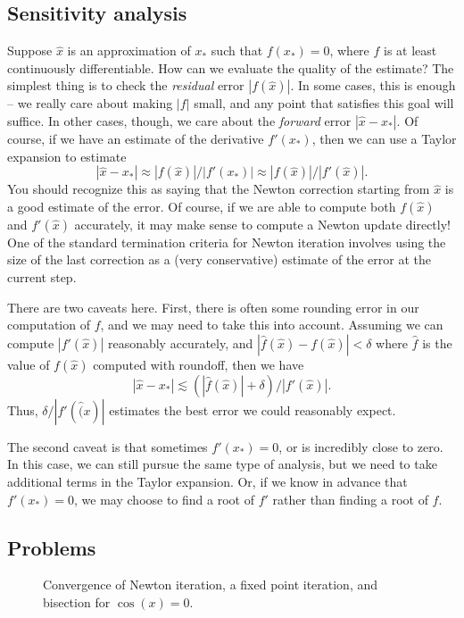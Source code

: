 \documentclass[12pt, leqno]{article}
\begin{document}
\subsection{Sensitivity analysis}

Suppose $\hat{x}$ is an approximation of $x_*$ such that $f(x_*) = 0$,
where $f$ is at least continuously differentiable.  How can we
evaluate the quality of the estimate?  The simplest thing is to check
the {\em residual} error $|f(\hat{x})|$.  In some cases, this is
enough -- we really care about making $|f|$ small, and any point that
satisfies this goal will suffice.  In other cases, though,
we care about the {\em forward} error $|\hat{x}-x_*|$.  Of course,
if we have an estimate of the derivative $f'(x_*)$, then we can
use a Taylor expansion to estimate
\[
  |\hat{x}-x_*| \approx |f(\hat{x})|/|f'(x_*)|
                \approx |f(\hat{x})|/|f'(\hat{x})|.
\]
You should recognize this as saying that the Newton correction
starting from $\hat{x}$ is a good estimate of the error.  Of course,
if we are able to compute both $f(\hat{x})$ and $f'(\hat{x})$
accurately, it may make sense to compute a Newton update directly!
One of the standard termination criteria for Newton iteration involves
using the size of the last correction as a (very conservative)
estimate of the error at the current step.

There are two caveats here.  First, there is often some rounding error
in our computation of $f$, and we may need to take this into account.
Assuming we can compute $|f'(\hat{x})|$ reasonably accurately, and
$|\hat{f}(\hat{x})-f(\hat{x})| < \delta$ where $\hat{f}$ is the value
of $f(\hat{x})$ computed with roundoff, then we have
\[
  |\hat{x}-x_*| \lesssim (|\hat{f}(\hat{x})|+\delta)/|f'(\hat{x})|.
\]
Thus, $\delta/|f'(\hat(x)|$ estimates the best error we could
reasonably expect.

The second caveat is that sometimes $f'(x_*) = 0$, or is incredibly
close to zero.  In this case, we can still pursue the same type of
analysis, but we need to take additional terms in the Taylor
expansion.  Or, if we know in advance that $f'(x_*) = 0$, we may
choose to find a root of $f'$ rather than finding a root of $f$.

\subsection{Problems}

\begin{figure}
  \caption{Convergence of Newton iteration, a fixed point iteration,
    and bisection for $\cos(x) = 0$.}
  \label{fig:itercomp}
\end{figure}
\end{document}
